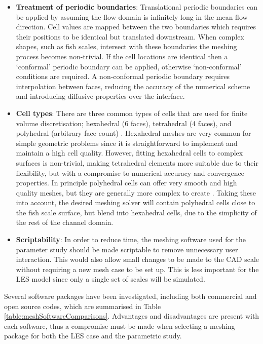 \documentclass[12pt,oneside,a4paper]{article}
\begin{document}
\begin{itemize}
\itemsep0em
\item 
\textbf{Treatment of periodic boundaries}: Translational periodic boundaries can be applied by assuming the flow domain is infinitely long in the mean flow direction. Cell values are mapped between the two boundaries which requires their positions to be identical but translated downstream. When complex shapes, such as fish scales, intersect with these boundaries the meshing process becomes non-trivial. If the cell locations are identical then a `conformal' periodic boundary can be applied, otherwise `non-conformal' conditions are required. A non-conformal periodic boundary requires interpolation between faces, reducing the accuracy of the numerical scheme and introducing diffusive properties over the interface. 

\item 
\textbf{Cell types}: There are three common types of cells that are used for finite volume discretisation; hexahedral (6 faces), tetrahedral (4 faces), and polyhedral (arbitrary face count) \citep{durbin2007}. Hexahedral meshes are very common for simple geometric problems since it is straightforward to implement and maintain a high cell quality. However, fitting hexahedral cells to complex surfaces is non-trivial, making tetrahedral elements more suitable due to their flexibility, but with a compromise to numerical accuracy and convergence properties. In principle polyhedral cells can offer very smooth and high quality meshes, but they are generally more complex to create \citep{durbin2007}. Taking these into account, the desired meshing solver will contain polyhedral cells close to the fish scale surface, but blend into hexahedral cells, due to the simplicity of the rest of the channel domain. 

\item
\textbf{Scriptability}:
In order to reduce time, the meshing software used for the parameter study should be made scriptable to remove unnecessary user interaction. This would also allow small changes to be made to the CAD scale without requiring a new mesh case to be set up. This is less important for the LES model since only a single set of scales will be simulated.

\end{itemize}

Several software packages have been investigated, including both commercial and open source codes, which are summarised in Table \ref{table:meshSoftwareComparisons}. Advantages and disadvantages are present with each software, thus a compromise must be made when selecting a meshing package for both the LES case and the parametric study.
\end{document}
